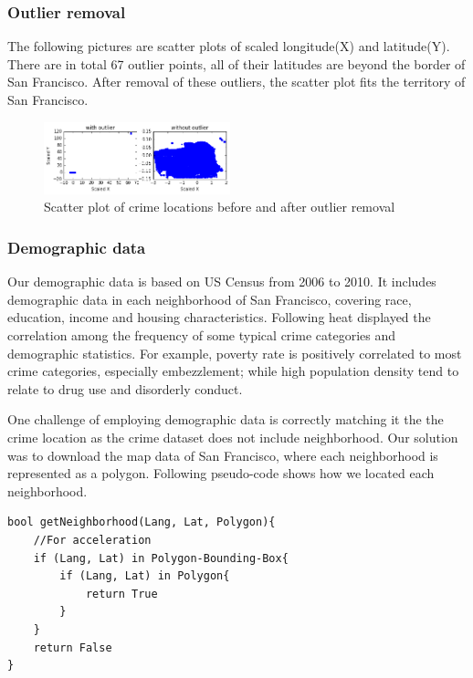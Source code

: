 \documentclass[11pt,conference]{IEEEtran}
\begin{document}
\subsubsection{Outlier removal}
The following pictures are scatter plots of scaled longitude(X) and latitude(Y). There are in total 67 outlier points, all of their latitudes are beyond the border of San Francisco. After removal of these outliers, the scatter plot fits the territory of San Francisco.
\begin{figure}[H]
\begin{center}
\includegraphics [width=0.48\textwidth]{pics/outliers.png}
\caption{Scatter plot of crime locations before and after outlier removal}
\end{center}
\end{figure}

\subsubsection{Demographic data}
Our demographic data is based on US Census from 2006 to 2010. It includes demographic data in each neighborhood of San Francisco, covering race, education, income and housing characteristics. Following heat displayed the correlation among the frequency of some typical crime categories and demographic statistics. For example, poverty rate is positively correlated to most crime categories, especially embezzlement; while high population density tend to relate to drug use and disorderly conduct.

One challenge of employing demographic data is correctly matching it the the crime location as the crime dataset does not include neighborhood. Our solution was to download the map data of San Francisco, where each neighborhood is represented as a polygon. Following pseudo-code shows how we located each neighborhood.
\begin{lstlisting}
bool getNeighborhood(Lang, Lat, Polygon){ 
	//For acceleration
	if (Lang, Lat) in Polygon-Bounding-Box{
		if (Lang, Lat) in Polygon{
			return True
		}
	}
	return False
}
\end{lstlisting}
\end{document}
